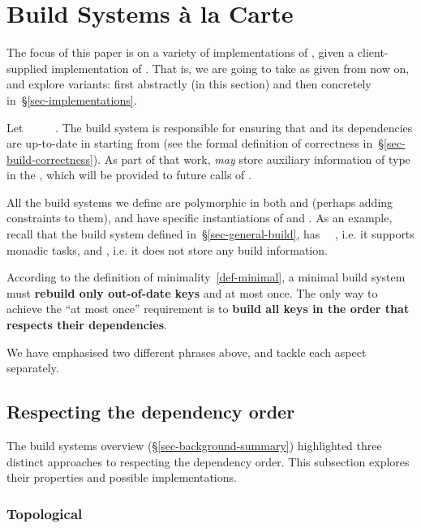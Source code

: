 \section{Build Systems \`a la Carte}\label{sec-build}

The focus of this paper is on a variety of implementations of , given
a client-supplied implementation of . That is, we are going to take
 as given from now on, and explore  variants: first
abstractly (in this section) and then concretely in~\S\ref{sec-implementations}.

Let ~\hs{=}~~~~. The build
system  is responsible for ensuring that  and its dependencies
are up-to-date in  starting from  (see the formal definition
of correctness in~\S\ref{sec-build-correctness}). As part of that work,
 \emph{may} store auxiliary information  of type  in
the , which will be provided to future calls of .

All the build systems we define are polymorphic in both  and 
(perhaps adding constraints to them), and have specific instantiations of 
and . As an example, recall that the  build system defined
in~\S\ref{sec-general-build}, has ~\hs{=}~, i.e. it supports
monadic tasks, and , i.e. it does not store any build information.

According to the definition of minimality~\ref{def-minimal}, a minimal build
system must \textbf{rebuild only out-of-date keys} and at most once. The only
way to achieve the ``at most once'' requirement is to \textbf{build all keys in
the order that respects their dependencies}.

We have emphasised two different phrases above, and tackle each aspect separately.

\subsection{Respecting the dependency order}
\label{sec-dependency-orderings}

The build systems overview (\S\ref{sec-background-summary}) highlighted three
distinct approaches to respecting the dependency order. This subsection explores
their properties and possible implementations.

\subsubsection{Topological}

